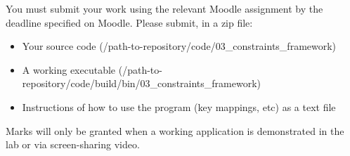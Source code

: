 \documentclass[12pt]{article}
\begin{document}
You must submit your work using the relevant Moodle assignment by the deadline specified on Moodle. Please submit, in a zip file:

\begin{itemize}
\item Your source code (/path-to-repository/code/03\_constraints\_framework)
\item A working executable (/path-to-repository/code/build/bin/03\_constraints\_framework)
\item Instructions of how to use the program (key mappings, etc) as a text file
\end{itemize}

Marks will only be granted when a working application is demonstrated in the lab or via screen-sharing video.
\end{document}
